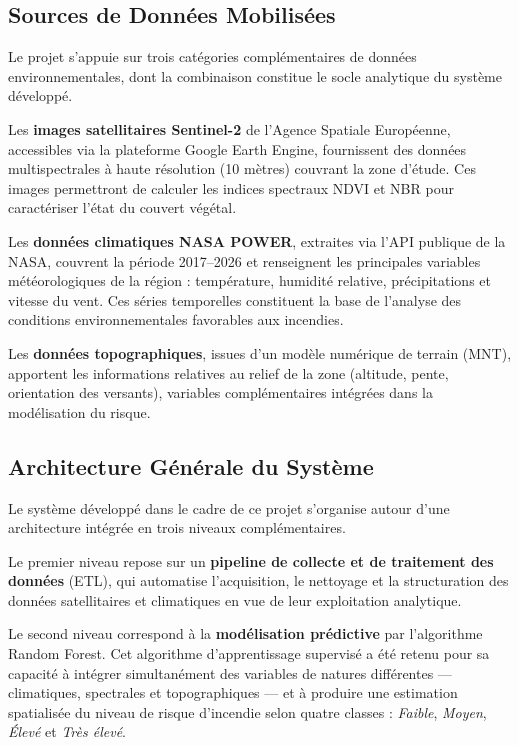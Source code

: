 \documentclass[12pt,a4paper]{report}
\begin{document}
\subsection{Sources de Données Mobilisées}

Le projet s'appuie sur trois catégories complémentaires de données environnementales, dont la combinaison constitue le socle analytique du système développé.

Les \textbf{images satellitaires Sentinel-2} de l'Agence Spatiale Européenne, accessibles via la plateforme Google Earth Engine, fournissent des données multispectrales à haute résolution (10 mètres) couvrant la zone d'étude. Ces images permettront de calculer les indices spectraux NDVI et NBR pour caractériser l'état du couvert végétal.

Les \textbf{données climatiques NASA POWER}, extraites via l'API publique de la NASA, couvrent la période 2017--2026 et renseignent les principales variables météorologiques de la région : température, humidité relative, précipitations et vitesse du vent. Ces séries temporelles constituent la base de l'analyse des conditions environnementales favorables aux incendies.

Les \textbf{données topographiques}, issues d'un modèle numérique de terrain (MNT), apportent les informations relatives au relief de la zone (altitude, pente, orientation des versants), variables complémentaires intégrées dans la modélisation du risque.

\subsection{Architecture Générale du Système}

Le système développé dans le cadre de ce projet s'organise autour d'une architecture intégrée en trois niveaux complémentaires.

Le premier niveau repose sur un \textbf{pipeline de collecte et de traitement des données} (ETL), qui automatise l'acquisition, le nettoyage et la structuration des données satellitaires et climatiques en vue de leur exploitation analytique.

Le second niveau correspond à la \textbf{modélisation prédictive} par l'algorithme Random Forest. Cet algorithme d'apprentissage supervisé a été retenu pour sa capacité à intégrer simultanément des variables de natures différentes — climatiques, spectrales et topographiques — et à produire une estimation spatialisée du niveau de risque d'incendie selon quatre classes : \textit{Faible}, \textit{Moyen}, \textit{Élevé} et \textit{Très élevé}.
\end{document}
